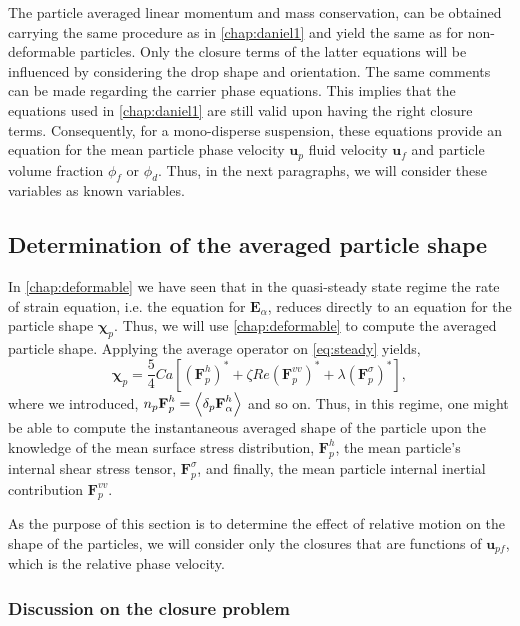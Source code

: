 The particle averaged linear momentum and mass conservation, can be obtained carrying the same procedure as in \ref{chap:daniel1} and yield the same as for non-deformable particles. 
Only the closure terms of the latter equations will be influenced by considering the drop shape and orientation.
The same comments can be made regarding the carrier phase equations. 
This implies that the equations used in \ref{chap:daniel1} are still valid upon having the right closure terms. 
Consequently, for a mono-disperse suspension, these equations provide an equation for the mean particle phase velocity $\textbf{u}_p$ fluid velocity $\textbf{u}_f$ and particle volume fraction $\phi_f$ or $\phi_d$. 
Thus, in the next paragraphs, we will consider these variables as known variables. 

\subsection{Determination of the averaged particle shape}

In \ref{chap:deformable} we have seen that in the quasi-steady state regime the rate of strain equation, i.e. the equation for $\textbf{E}_\alpha$, reduces directly to an equation for the particle shape $\bm\chi_p$. 
Thus, we will use \ref{chap:deformable} to compute the averaged particle shape. 
Applying the average operator on \ref{eq:steady} yields,
\begin{equation}
    \bm\chi_{p}
    = 
    \frac{5}{4}Ca \left[
        (\textbf{F}_p^h )^*
        + \zeta Re (\textbf{F}_p^{vv})^*
        +    \lambda (\textbf{F}_p^{\sigma})^*
    \right],
    \label{eq:steady_state_avg}
\end{equation}
where we introduced, $n_p \textbf{F}_p^h = \left<\delta_p \textbf{F}_\alpha^h\right>$ and so on. 
Thus, in this regime, one might be able to compute the instantaneous averaged shape of the particle upon the knowledge of the mean surface stress distribution, $\textbf{F}_p^h$, the mean particle's internal shear stress tensor, $\textbf{F}_p^{\sigma}$, and finally, the mean particle internal inertial contribution $\textbf{F}_p^{vv}$. 

As the purpose of this section is to determine the effect of relative motion on the shape of the particles, we will consider only the closures that are functions of $\textbf{u}_{pf}$, which is the relative phase velocity. 

\subsubsection{Discussion on the closure problem}   

